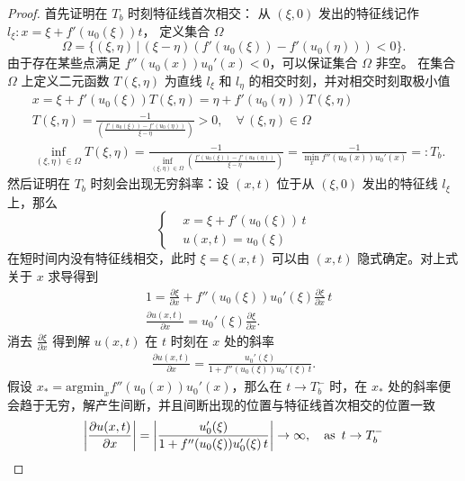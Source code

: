 \begin{proof}
    首先证明在 $T_b$ 时刻特征线首次相交：
    从 $(\xi,0)$ 发出的特征线记作 $l_\xi: x = \xi + f'(u_0(\xi))t$，
    定义集合 $\Omega$
    \[
        \Omega = \{(\xi,\eta) \,|\,  (\xi-\eta)(f'(u_0(\xi)) - f'(u_0(\eta))) < 0\}.
    \]
    由于存在某些点满足 $f''(u_0(x)) u_0'(x)<0$，可以保证集合 $\Omega$ 非空。
    在集合 $\Omega$ 上定义二元函数 $T(\xi,\eta)$ 为直线 $l_\xi$ 和 $l_\eta$ 的相交时刻，并对相交时刻取极小值
    \begin{align*}
         & x = \xi + f'(u_0(\xi)) T(\xi,\eta) = \eta + f'(u_0(\eta))T(\xi,\eta)                                                                       \\
         & T(\xi,\eta) = \frac{-1}{\left(\frac{f'(u_0(\xi))-f'(u_0(\eta))}{\xi-\eta}\right)} > 0 ,\quad \forall\, (\xi,\eta) \in \Omega               \\
         & \inf_{(\xi,\eta)\in \Omega} T(\xi,\eta) = \frac{-1}{\inf_{(\xi,\eta)\in \Omega} \left(\frac{f'(u_0(\xi))-f'(u_0(\eta))}{\xi-\eta}\right) }
        = \frac{-1}{\min_x f''(u_0(x)) u_0'(x)} =: T_b.
    \end{align*}
    然后证明在 $T_b$ 时刻会出现无穷斜率：设 $(x,t)$ 位于从 $(\xi,0)$ 发出的特征线 $l_\xi$ 上，那么
    \[
        \left\{
        \begin{aligned}
             & x = \xi + f'(u_0(\xi))\, t \\
             & u(x,t) = u_0(\xi)
        \end{aligned}
        \right.
    \]
    在短时间内没有特征线相交，此时 $\xi = \xi(x,t)$ 可以由 $(x,t)$ 隐式确定。对上式关于 $x$ 求导得到
    \begin{align*}
         & 1 = \frac{\partial \xi}{\partial x} + f''(u_0(\xi)) u_0'(\xi) \frac{\partial \xi}{\partial x} \,t \\
         & \frac{\partial u(x,t)}{\partial x} = u_0'(\xi)\frac{\partial \xi}{\partial x}.
    \end{align*}
    消去 $\frac{\partial \xi}{\partial x}$ 得到解 $u(x,t)$ 在 $t$ 时刻在 $x$ 处的斜率
    \begin{align*}
        \frac{\partial u(x,t)}{\partial x} =
        \frac{u_0'(\xi)}{1+f''(u_0(\xi)) u_0'(\xi)\,t}.
    \end{align*}
    假设 $x_*=\text{argmin}_x f''(u_0(x))u_0'(x)$，那么在 $t \to T_b^-$ 时，在 $x_*$ 处的斜率便会趋于无穷，解产生间断，并且间断出现的位置与特征线首次相交的位置一致
    \[
        \left|\frac{\partial u(x,t)}{\partial x}\right| =  \left|\frac{u_0'(\xi)}{1+f''(u_0(\xi)) u_0'(\xi)\,t}\right| \to \infty,
        \quad \text{as}\,\,\, t \to T_b^-  \qedhere
    \]
\end{proof}

